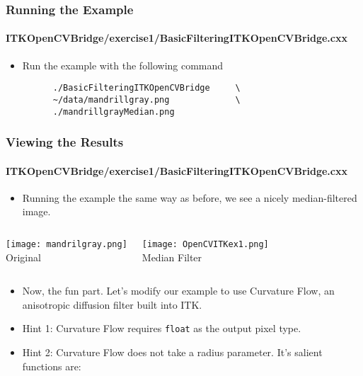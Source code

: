 \begin{frame}[fragile]
\frametitle{Running the Example}
\framesubtitle{ITKOpenCVBridge/exercise1/BasicFilteringITKOpenCVBridge.cxx}
\begin{itemize}
\item Run the example with the following command
\begin{verbatim}
      ./BasicFilteringITKOpenCVBridge     \
      ~/data/mandrillgray.png             \
      ./mandrillgrayMedian.png 
\end{verbatim}
\end{itemize}
\end{frame}

\begin{frame}
\frametitle{Viewing the Results}
\framesubtitle{ITKOpenCVBridge/exercise1/BasicFilteringITKOpenCVBridge.cxx}
\begin{itemize}
\item Running the example the same way as before, we see a nicely
median-filtered image.
\end{itemize}
\begin{columns}[c]
\begin{center}
\texttt{[image: mandrilgray.png]} \\
Original
\end{center}
\begin{center}
\texttt{[image: OpenCVITKex1.png]} \\
Median Filter
\end{center}
\end{columns}
\pause
\begin{itemize}
\item Now, the fun part. Let's modify our example to use Curvature Flow, an
anisotropic diffusion filter built into ITK.
\end{itemize}
\end{frame}

\begin{frame}
\begin{itemize}
\frametitle{Exercise 1}
\framesubtitle{ITKOpenCVBridge/exercise1/BasicFilteringITKOpenCVBridge.cxx}
\item Hint 1: Curvature Flow requires {\tt float} as the output pixel
  type.
\pause
\item Hint 2: Curvature Flow does not take a radius parameter. It's
  salient functions are:
\end{itemize}
\end{frame}

